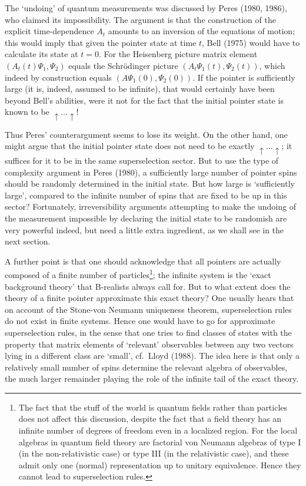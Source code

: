 \documentclass[12pt,titlepage]{article}
\newcommand{\fn}{\footnote}
\newcommand{\Up}{\uparrow\ldots\uparrow}
\begin{document}
The `undoing' of quantum measurements was discussed by Peres (1980, 1986), who
claimed its
impossibility. The argument is that the construction of the  explicit
time-dependence $A_t$ amounts
to an inversion of the equations of motion; this would imply that given the
pointer state at time
$t$,    Bell (1975)  would have to calculate its state at $t=0$. For the
Heisenberg
picture matrix element $(A_t(t)\Psi_1,\Psi_2)$ equals the Schr\"{o}dinger
picture
$(A_t\Psi_1(t),\Psi_2(t))$, which indeed by construction equals
$(A\Psi_1(0),\Psi_2(0))$. If the
pointer is sufficiently large (it is, indeed, assumed to be infinite), that
would certainly have been
beyond Bell's abilities, were it not for the fact that the initial pointer
state is known to be $\Up$!

Thus Peres' counterargument seems to lose its weight. On the other hand, one
might argue that the
initial pointer state does not need to be exactly $\Up$; it suffices for it to
be in the same
superselection sector. But to use the type of complexity argument in Peres
(1980), a sufficiently
large number of pointer spins should be randomly determined in the initial
state. But how large is
`sufficiently large', compared to the infinite number of spins that are fixed
to be up in this
sector? Fortunately, irreversibility arguments attempting to make the
undoing of the measurement impossible by declaring  the initial state to be
randomish are very
powerful indeed, but need a little extra ingredient, as we shall see in the
next section.

A further point is that one should acknowledge that all pointers are actually
composed of a finite
number of particles\fn{The fact that the stuff of the world is quantum fields
rather than particles
does not affect this discussion, despite the fact that a field theory has an
infinite number of
degrees of freedom even in a localized region. For the local algebras in
quantum field theory are
factorial von Neumann algebras of type I (in the non-relativistic case) or type
III (in the
relativistic case), and these admit only one (normal) representation up to
unitary equivalence.
Hence they cannot lead to superselection rules.}; the
infinite system is the `exact background theory' that B-realists always call
for. But to what extent
does the theory of a finite pointer approximate this exact theory? One usually
hears that on account
of the Stone-von Neumann uniqueness theorem, superselection rules do not exist
in finite systems.
Hence one would have to go for approximate superselection rules, in the sense
that one tries to find
classes of states with the property that matrix elements of `relevant'
observables between any two
vectors lying in a different class are `small', cf.\ Lloyd (1988). The idea
here is that only a
relatively small number of spins determine the  relevant algebra of
observables, the much larger
remainder playing the role of the infinite tail of the exact theory.
\end{document}
